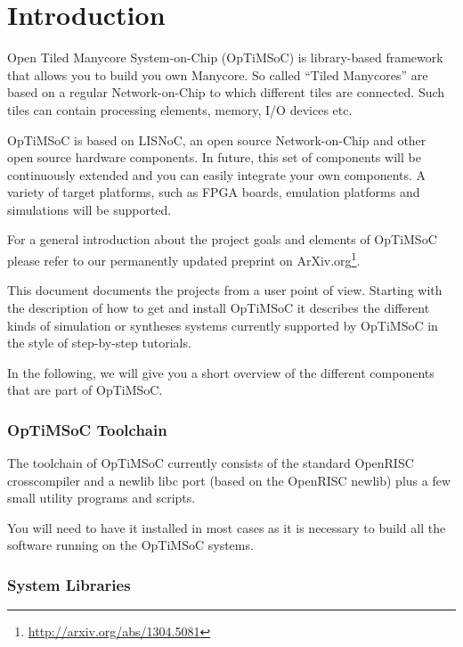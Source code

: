 \chapter{Introduction}
\label{chap:introduction}

Open Tiled Manycore System-on-Chip (OpTiMSoC) is library-based
framework that allows you to build you own Manycore. So called ``Tiled
Manycores'' are based on a regular Network-on-Chip to which different
tiles are connected. Such tiles can contain processing elements,
memory, I/O devices etc.

OpTiMSoC is based on LISNoC, an open source Network-on-Chip and other
open source hardware components. In future, this set of components
will be continuously extended and you can easily integrate your own
components. A variety of target platforms, such as FPGA boards,
emulation platforms and simulations will be supported.

For a general introduction about the project goals and elements of
OpTiMSoC please refer to our permanently updated preprint on
ArXiv.org\footnote{\url{http://arxiv.org/abs/1304.5081}}.

\medskip

This document documents the projects from a user point of view.
Starting with the description of how to get and install OpTiMSoC it
describes the different kinds of simulation or syntheses systems
currently supported by OpTiMSoC in the style of step-by-step
tutorials.

In the following, we will give you a short overview of the different
components that are part of OpTiMSoC.

\subsection*{OpTiMSoC Toolchain}

The toolchain of OpTiMSoC currently consists of the standard OpenRISC
crosscompiler and a newlib libc port (based on the OpenRISC newlib)
plus a few small utility programs and scripts.

You will need to have it installed in most cases as it is necessary to
build all the software running on the OpTiMSoC systems.

\subsection*{System Libraries}

